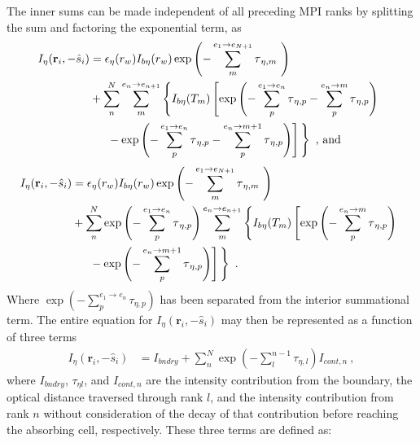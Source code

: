 The inner sums can be made independent of all preceding MPI ranks by splitting the sum and factoring the exponential term, as
\begin{equation}
    \begin{aligned}
    I_\eta{}(\textbf{r}_i,-\hat{s}_i)& = 
    \epsilon{}_\eta{}(r_w)I_{b\eta{}}(r_w)\exp{\left(-\sum_{m}^{e_1\rightarrow{}e_{N+1}}\tau{}_{\eta{},m}~\right)}\\
    &+\sum_{n}^{N}\sum_{m}^{e_n\rightarrow{}e_{n+1}}\left\{ I_{b\eta}(T_m)\left[ \exp{\left(-\sum_{p}^{e_1\rightarrow{}e_n}\tau{}_{\eta{},p}-\sum_{p}^{e_n\rightarrow{}m}\tau{}_{\eta,p}\right)}\right.{} \right.{} \\
    &\quad \left.{}\left.{} -\exp{\left(-\sum_{p}^{e_1\rightarrow{}e_n}\tau{}_{\eta{},p}-\sum_{p}^{e_n\rightarrow{}m+1}\tau{}_{\eta{},p}\right)} \vphantom{\frac12}\right] \vphantom{\frac12}\right\}~\text{, and}
    \end{aligned}
\end{equation}
\begin{equation}
    \begin{aligned}
    I_\eta{}(\textbf{r}_i,-\hat{s}_i)& = 
    \epsilon{}_\eta{}(r_w)I_{b\eta{}}(r_w)\exp{\left(-\sum_{m}^{e_1\rightarrow{}e_{N+1}}\tau{}_{\eta{},m}~\right)}\\
    &+\sum_{n}^{N}\exp\left(-\sum_{p}^{e_1\rightarrow{}e_n}\tau{}_{\eta{},p}\right)\sum_{m}^{e_n\rightarrow{}e_{n+1}}\left\{ I_{b\eta}(T_m)\left[ \exp{\left(-\sum_{p}^{e_n\rightarrow{}m}\tau{}_{\eta,p}\right)}\right.{} \right.{} \\
    &\quad \left.{}\left.{} -\exp{\left(-\sum_{p}^{e_n\rightarrow{}m+1}\tau{}_{\eta{},p}\right)} \vphantom{\frac12}\right] \vphantom{\frac12}\right\}~.
    \end{aligned}
\end{equation}
Where $\exp\left(-\sum_{p}^{e_1\rightarrow{}e_n}\tau{}_{\eta{},p}\right)$ has been separated from the interior summational term. The entire equation for $I_\eta{}(\textbf{r}_i,-\hat{s}_i)$ may then be represented as a function of three terms
\begin{equation}
    \begin{aligned}
    I_\eta{}(\textbf{r}_i,-\hat{s}_i)& = 
    I_{bndry}+\sum_{n}^{N}\exp\left(-\sum_{l}^{n-1}\tau{}_{\eta{},l}\right)I_{cont,n}~,
    \end{aligned}
    \label{eq:NewRMCRTintensity}
\end{equation}
where $I_{bndry}$, $\tau{}_{\eta{}l}$, and $I_{cont,n}$ are the intensity contribution from the boundary, the optical distance traversed through rank $l$, and the intensity contribution from rank $n$ without consideration of the decay of that contribution before reaching the absorbing cell, respectively. These three terms are defined as:
